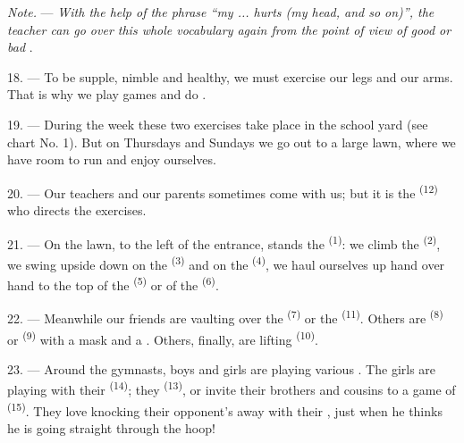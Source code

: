 \textit{Note.} --- \textit{With the help of the phrase “my ... hurts (my head, and so on)”,
the teacher can go over this whole vocabulary again from the point of view of good or bad}
.

\VUsaut{5.0mm}
\VUsaut{2.4mm}
\VUsaut{3.0mm}

18. --- To be supple, nimble and healthy, we must exercise our legs and our arms. That is why
we play games and do .

19. --- During the week these two exercises take place in the school yard (see chart No. 1).
But on Thursdays and Sundays we go out to a large lawn, where we have room to run and enjoy
ourselves.

20. --- Our teachers and our parents sometimes come with us; but it is the
 \textsuperscript{(12)} who directs the exercises.

21. --- On the lawn, to the left of the entrance, stands the
 \textsuperscript{(1)}: we climb the 
\textsuperscript{(2)}, we swing upside down on the  \textsuperscript{(3)} and on
the  \textsuperscript{(4)}, we haul ourselves up hand over hand to the top of
the  \textsuperscript{(5)} or of the
 \textsuperscript{(6)}.

22. --- Meanwhile our friends are vaulting over the 
\textsuperscript{(7)} or the  \textsuperscript{(11)}. Others are
 \textsuperscript{(8)} or  \textsuperscript{(9)} with a mask
and a . Others, finally, are lifting  \textsuperscript{(10)}.

\VUsaut{4.6mm}
\VUsaut{3.0mm}

23. --- Around the gymnasts, boys and girls are playing various
. The girls are playing with their 
\textsuperscript{(14)}; they  \textsuperscript{(13)}, or invite their brothers
and cousins to a game of  \textsuperscript{(15)}. They love knocking their
opponent's  away with their
, just when he thinks he is going straight through the
hoop!

